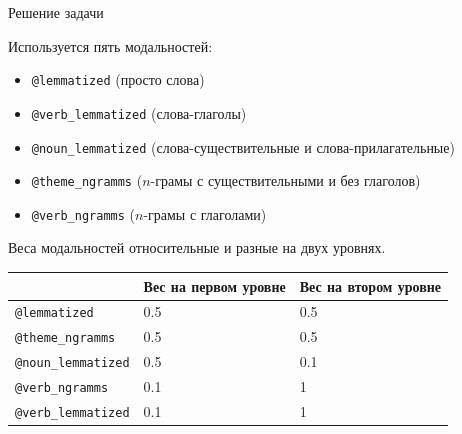 \begin{frame}{Решение задачи}


Используется пять модальностей:
\begin{itemize}
    \item \texttt{@lemmatized} (просто слова)
    \item \texttt{@verb\_lemmatized} (слова-глаголы)
    \item \texttt{@noun\_lemmatized} (слова-существительные и слова-прилагательные)
    \item \texttt{@theme\_ngramms} ($n$-грамы с существительными и без глаголов)
    \item \texttt{@verb\_ngramms} ($n$-грамы с глаголами)
\end{itemize}


\bigskip
Веса модальностей относительные и разные на двух уровнях.
\begin{table}[]
\begin{tabular}{|l|l|l|}\hline
                & Вес на первом уровне & Вес на втором уровне \\ \hline
\texttt{@lemmatized}     & 0.5                  & 0.5                  \\ \hline
 \texttt{@theme\_ngramms}   & 0.5                  & 0.5                  \\ 
\texttt{@noun\_lemmatized} & 0.5                  & 0.1                 \\ \hline
\texttt{@verb\_ngramms}    & 0.1                  & 1                    \\ 
\texttt{@verb\_lemmatized} & 0.1                  & 1                    \\ \hline
\end{tabular}
\end{table}

\end{frame}

